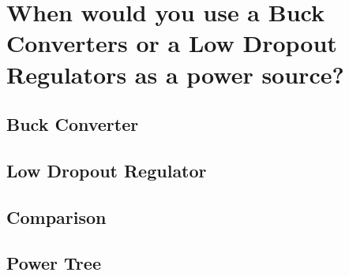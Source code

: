 \documentclass[main.tex]{subfiles}
\begin{document}
\section{When would you use a Buck Converters or a Low Dropout Regulators as a power source?}

\subsection{Buck Converter}

\subsection{Low Dropout Regulator}

\subsection{Comparison}

\subsection{Power Tree}
\end{document}
